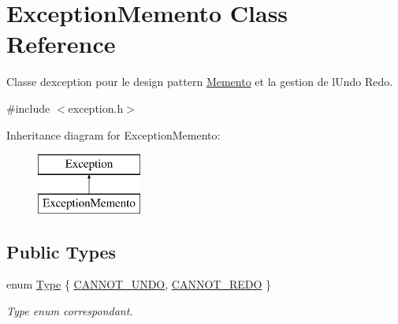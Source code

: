 \hypertarget{class_exception_memento}{}\section{Exception\+Memento Class Reference}
\label{class_exception_memento}


Classe d\textquotesingle{}exception pour le design pattern \hyperlink{class_memento}{Memento} et la gestion de l\textquotesingle{}Undo Redo.  




{\ttfamily \#include $<$exception.\+h$>$}

Inheritance diagram for Exception\+Memento\+:\begin{figure}[H]
\begin{center}
\leavevmode
\includegraphics[height=2.000000cm]{class_exception_memento}
\end{center}
\end{figure}
\subsection*{Public Types}
\begin{DoxyCompactItemize}
\item 
enum \hyperlink{class_exception_memento_a83ec20464c7ba61569afeb4477f1504e}{Type} \{ \hyperlink{class_exception_memento_a83ec20464c7ba61569afeb4477f1504ea9f16db6c0e64e2a901a245fdf853058a}{C\+A\+N\+N\+O\+T\+\_\+\+U\+N\+DO}, 
\hyperlink{class_exception_memento_a83ec20464c7ba61569afeb4477f1504eae5de90f573b1df7d52ef3c32bf80f4b5}{C\+A\+N\+N\+O\+T\+\_\+\+R\+E\+DO}
 \}\begin{DoxyCompactList}\small\item\em Type enum correspondant. \end{DoxyCompactList}
\end{DoxyCompactItemize}
